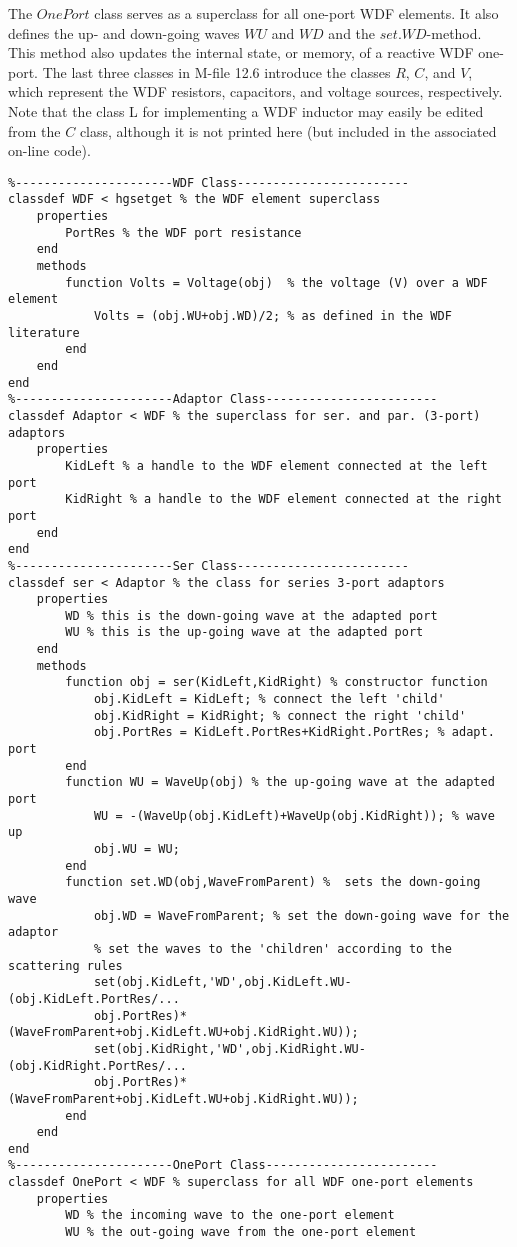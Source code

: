 \documentclass[10pt,a4paper,oneside]{article}
\begin{document}
The $OnePort$ class serves as a superclass for all one-port WDF elements. It also defines the up- and down-going waves $WU$ and $WD$ and the $set.WD$-method. This method also updates the internal state, or memory, of a reactive WDF one-port. The last three classes in M-file 12.6 introduce the classes $R$, $C$, and $V$, which represent the WDF resistors, capacitors, and voltage sources, respectively. Note that the class L for implementing a WDF inductor may easily be edited from the $C$ class, although it is not printed here (but included in the associated on-line code).
\begin{lstlisting}
%----------------------WDF Class------------------------
classdef WDF < hgsetget % the WDF element superclass
	properties 
		PortRes % the WDF port resistance
	end
	methods
		function Volts = Voltage(obj)  % the voltage (V) over a WDF element
			Volts = (obj.WU+obj.WD)/2; % as defined in the WDF literature
		end
	end
end
%----------------------Adaptor Class------------------------
classdef Adaptor < WDF % the superclass for ser. and par. (3-port) adaptors
	properties
		KidLeft % a handle to the WDF element connected at the left port
		KidRight % a handle to the WDF element connected at the right port
	end
end
%----------------------Ser Class------------------------
classdef ser < Adaptor % the class for series 3-port adaptors
	properties
		WD % this is the down-going wave at the adapted port
		WU % this is the up-going wave at the adapted port
	end
	methods 
		function obj = ser(KidLeft,KidRight) % constructor function
			obj.KidLeft = KidLeft; % connect the left 'child'
			obj.KidRight = KidRight; % connect the right 'child'
			obj.PortRes = KidLeft.PortRes+KidRight.PortRes; % adapt. port
		end
		function WU = WaveUp(obj) % the up-going wave at the adapted port
			WU = -(WaveUp(obj.KidLeft)+WaveUp(obj.KidRight)); % wave up
			obj.WU = WU; 
		end
		function set.WD(obj,WaveFromParent) %  sets the down-going wave
			obj.WD = WaveFromParent; % set the down-going wave for the adaptor
			% set the waves to the 'children' according to the scattering rules
			set(obj.KidLeft,'WD',obj.KidLeft.WU-(obj.KidLeft.PortRes/...
			obj.PortRes)*(WaveFromParent+obj.KidLeft.WU+obj.KidRight.WU)); 
			set(obj.KidRight,'WD',obj.KidRight.WU-(obj.KidRight.PortRes/...
			obj.PortRes)*(WaveFromParent+obj.KidLeft.WU+obj.KidRight.WU));
		end
	end 
end
%----------------------OnePort Class------------------------
classdef OnePort < WDF % superclass for all WDF one-port elements
	properties
		WD % the incoming wave to the one-port element
		WU % the out-going wave from the one-port element

\end{lstlisting}
\end{document}
